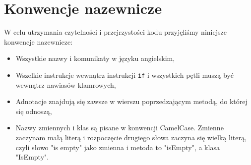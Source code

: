 \documentclass[10pt, a4paper]{report}
\begin{document}
    \section{Konwencje nazewnicze}
    W celu utrzymania czytelności i przejrzystości kodu przyjęliśmy niniejsze konwencje nazewnicze:
    \begin{itemize}
      \item Wszystkie nazwy i komunikaty w języku angielskim,
      \item Wszelkie instrukcje wewnątrz instrukcji \texttt{if} i wszystkich pętli muszą być wewnątrz nawiasów klamrowych,
      \item Adnotacje znajdują się zawsze w wierszu poprzedzającym metodą, do której się odnoszą,
      \item Nazwy zmiennych i klas są pisane w konwencji CamelCase. Zmienne zaczynam małą literą i rozpoczęcie drugiego słowa zaczyna się wielką literą, czyli słowo "is empty" jako zmienna i metoda to "isEmpty", a klasa
      "IsEmpty".
    \end{itemize}
\end{document}
